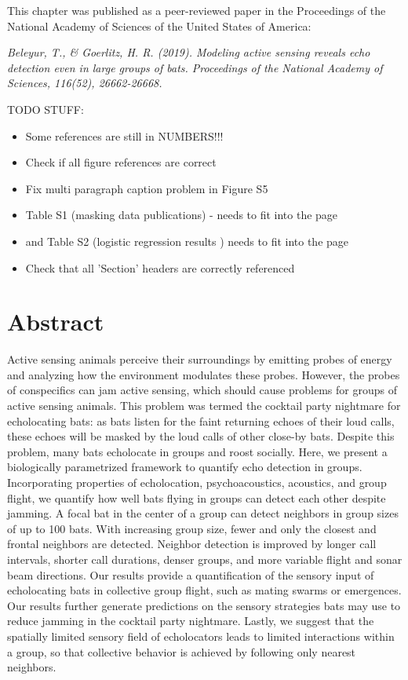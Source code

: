 \documentclass[
]{book}
\begin{document}

This chapter was published as a peer-reviewed paper in the Proceedings of the National Academy of Sciences of the United States of America:

\emph{Beleyur, T., \& Goerlitz, H. R. (2019). Modeling active sensing reveals echo detection even in large groups of bats. Proceedings of the National Academy of Sciences, 116(52), 26662-26668.}

TODO STUFF:

\begin{itemize}
\item Some references are still in NUMBERS!!!
\item Check if all figure references are correct
\item Fix multi  paragraph caption problem in Figure S5
\item Table S1 (masking data publications) - needs to fit into the page
\item and Table S2 (logistic regression results ) needs to fit into the page 
\item Check that all 'Section' headers are correctly referenced
\end{itemize}

\newpage

\hypertarget{cpn_abstract}{%
\section*{Abstract}\label{cpn_abstract}}

Active sensing animals perceive their surroundings by emitting probes of energy and analyzing how the environment modulates these probes. However, the probes of conspecifics can jam active sensing, which should cause problems for groups of active sensing animals. This problem was termed the cocktail party nightmare for echolocating bats: as bats listen for the faint returning echoes of their loud calls, these echoes will be masked by the loud calls of other close-by bats. Despite this problem, many bats echolocate in groups and roost socially. Here, we present a biologically parametrized framework to quantify echo detection in groups. Incorporating properties of echolocation, psychoacoustics, acoustics, and group flight, we quantify how well bats flying in groups can detect each other despite jamming. A focal bat in the center of a group can detect neighbors in group sizes of up to 100 bats. With increasing group size, fewer and only the closest and frontal neighbors are detected. Neighbor detection is improved by longer call intervals, shorter call durations, denser groups, and more variable flight and sonar beam directions. Our results provide a quantification of the sensory input of echolocating bats in collective group flight, such as mating swarms or emergences. Our results further generate predictions on the sensory strategies bats may use to reduce jamming in the cocktail party nightmare. Lastly, we suggest that the spatially limited sensory field of echolocators leads to limited interactions within a group, so that collective behavior is achieved by following only nearest neighbors.
\end{document}
